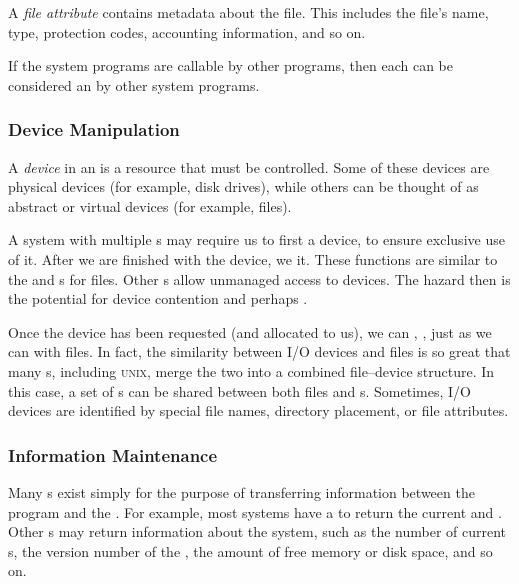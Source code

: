 \begin{definition}\label{def:File_Attribute}
  A \emph{file attribute} contains metadata about the file.
  This includes the file's name, type, protection codes, accounting information, and so on.
\end{definition}

\begin{remark*}
  If the system programs are callable by other programs, then each can be considered an  by other system programs.
\end{remark*}

\subsubsection{Device Manipulation}\label{subsubsec:Device_Manipulation}
\begin{definition}[Device]\label{def:Device}
  A \emph{device} in an  is a resource that must be controlled.
  Some of these devices are physical devices (for example, disk drives), while others can be thought of as abstract or virtual devices (for example, files).
\end{definition}

A system with multiple s may require us to first  a device, to ensure exclusive use of it.
After we are finished with the device, we  it.
These functions are similar to the  and  s for files.
Other s allow unmanaged access to devices.
The hazard then is the potential for device contention and perhaps .

Once the device has been requested (and allocated to us), we can , , just as we can with files.
In fact, the similarity between I/O devices and files is so great that many s, including \textsc{unix}, merge the two into a combined file–device structure.
In this case, a set of s can be shared between both files and s.
Sometimes, I/O devices are identified by special file names, directory placement, or file attributes.

\subsubsection{Information Maintenance}\label{subsubsec:Information_Maintenance}
Many s exist simply for the purpose of transferring information between the  program and the .
For example, most systems have a  to return the current  and .
Other s may return information about the system, such as the number of current s, the version number of the , the amount of free memory or disk space, and so on.

